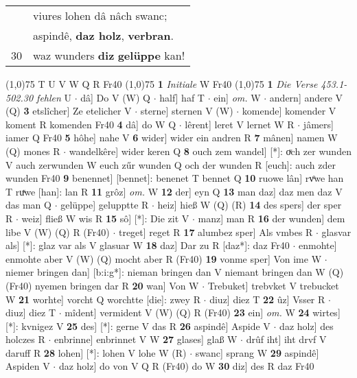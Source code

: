 \documentclass[8pt,a4paper,notitlepage]{article}
\begin{document}
\begin{table}[ht]
\begin{minipage}[t]{0.5\linewidth}
\begin{tabular}{rl}
 & viures lohen dâ nâch swanc;\\ 
 & aspindê, \textbf{daz holz}, \textbf{verbran}.\\ 
30 & waz wunders \textbf{diz} \textbf{gelüppe} kan!\\ 
\end{tabular}
\scriptsize
\line(1,0){75} \newline
T U V W Q R Fr40 \newline
\line(1,0){75} \newline
\textbf{1} \textit{Initiale} W Fr40  \newline
\line(1,0){75} \newline
\textbf{1} \textit{Die Verse 453.1-502.30 fehlen} U   $\cdot$ dâ] Do V (W) Q  $\cdot$ half] haf T  $\cdot$ ein] \textit{om.} W  $\cdot$ andern] andere V (Q) \textbf{3} etslîcher] Ze etelicher V  $\cdot$ sterne] sternen V (W)  $\cdot$ komende] komender V koment R komenden Fr40 \textbf{4} dâ] do W Q  $\cdot$ lêrent] leret V lernet W R  $\cdot$ jâmers] iamer Q Fr40 \textbf{5} hôhe] nahe V \textbf{6} wider] wider ein andren R \textbf{7} mânen] namen W (Q) mones R  $\cdot$ wandelkêre] wider keren Q \textbf{8} ouch zem wandel] [*]: oͮch zer wunden V auch zerwunden W euch zűr wunden Q och der wunden R [euch]: auch zder wunden Fr40 \textbf{9} benennet] [bennet]: benenet T bennet Q \textbf{10} ruowe lân] rvͦwe han T ruͯwe [han]: lan R \textbf{11} grôz] \textit{om.} W \textbf{12} der] eyn Q \textbf{13} man daz] daz men daz V das man Q  $\cdot$ gelüppe] gelupptte R  $\cdot$ heiz] hieß W (Q) (R) \textbf{14} des spers] der sper R  $\cdot$ weiz] fließ W wis R \textbf{15} sô] [*]: Die zit V  $\cdot$ manz] man R \textbf{16} der wunden] dem libe V (W) (Q) R (Fr40)  $\cdot$ treget] reget R \textbf{17} alumbez sper] Als vmbes R  $\cdot$ glasvar als] [*]: glaz var als V glasuar W \textbf{18} daz] Dar zu R [daz*]: daz Fr40  $\cdot$ enmohte] enmohte aber V (W) (Q) mocht aber R (Fr40) \textbf{19} vonme sper] Von ime W  $\cdot$ niemer bringen dan] [b:i:g*]: nieman bringen dan V niemant bringen dan W (Q) (Fr40) nyemen bringen dar R \textbf{20} wan] Von W  $\cdot$ Trebuket] trebvket V trebucket W \textbf{21} worhte] vorcht Q worchtte [die]: zwey R  $\cdot$ diuz] diez T \textbf{22} ûz] Vsser R  $\cdot$ diuz] diez T  $\cdot$ mîdent] vermident V (W) (Q) R (Fr40) \textbf{23} ein] \textit{om.} W \textbf{24} wirtes] [*]: kvnigez V \textbf{25} des] [*]: gerne V das R \textbf{26} aspindê] Aspide V  $\cdot$ daz holz] des holczes R  $\cdot$ enbrinne] enbrinnet V W \textbf{27} glases] glaß W  $\cdot$ drûf iht] iht drvf V daruff R \textbf{28} lohen] [*]: lohen V lohe W (R)  $\cdot$ swanc] sprang W \textbf{29} aspindê] Aspiden V  $\cdot$ daz holz] do von V Q R (Fr40) do W \textbf{30} diz] des R daz Fr40 \newline
\end{minipage}
\end{table}
\end{document}
